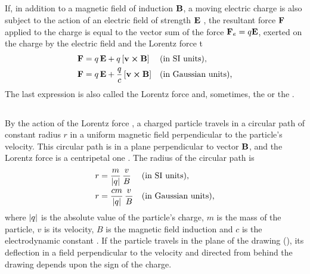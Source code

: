 \subsection{}\label{24.1.5} If, in addition to a magnetic field of induction $\vb{B}$, a moving electric charge is also subject to the action of an electric field of strength $\vb{E}$ , the resultant force $\vb{F}$ applied to the charge is equal to the vector sum of the force $\vb{F}_{e} = q\vb{E}$, exerted on the charge by the electric field and the Lorentz force t
\begin{align*}%
\vb{F} & = q\,\vb{E} + q\,[\vb{v} \cross \vb{B}]  &&  \text{(in SI units),} \\
\vb{F} & = q\,\vb{E} + \frac{q}{c}\,[\vb{v} \cross \vb{B}]  &&  \text{(in Gaussian units),}
\end{align*}
The last expression is also called the Lorentz force and, sometimes, the  or the . 

\subsection{}\label{24.1.6} By the action of the Lorentz force , a charged particle travels in a circular path of constant radius $r$ in a uniform magnetic field perpendicular to the particle's velocity. This circular path is in a plane perpendicular to vector $\vb{B}$, and the Lorentz force is a centripetal one . The radius of the circular path is
\begin{align*}%
r & = \frac{m}{\abs{q}} \,\frac{v}{B}  &&  \text{(in SI units),} \\
r & = \frac{cm}{\abs{q}} \, \frac{v}{B}   &&  \text{(in Gaussian units),}
\end{align*}
where $\abs{q}$ is the absolute value of the particle's charge, $m$ is the mass of the particle, $v$ is its velocity, $B$ is the magnetic field induction and $c$ is the electrodynamic constant . If the particle travels in the plane of the drawing (), its deflection in a field perpendicular to the velocity and directed from behind the drawing depends upon the sign of the charge. 

